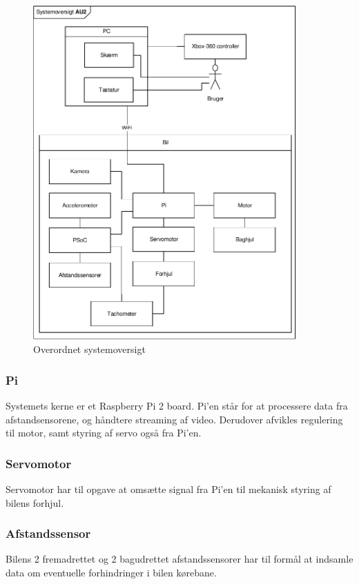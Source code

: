 \begin{figure}[h]
\centering
\includegraphics[width=0.9\textwidth]{../fig/diagrammer/systemoversigt.pdf}
\caption{Overordnet systemoversigt}
\label{fig:systemoversigt}
\end{figure}
\clearpage

\subsubsection{Pi}
Systemets kerne er et Raspberry Pi 2 board.
Pi'en står for at processere data fra afstandsensorene, og håndtere streaming af video. Derudover afvikles regulering til motor, samt styring af servo også fra Pi'en. 

\subsubsection{Servomotor}
Servomotor har til opgave at omsætte signal fra Pi'en til mekanisk styring af bilens forhjul. 

\subsubsection{Afstandssensor}
Bilens 2 fremadrettet og 2 bagudrettet afstandssensorer har til formål at indsamle data om eventuelle forhindringer i bilen kørebane. 

